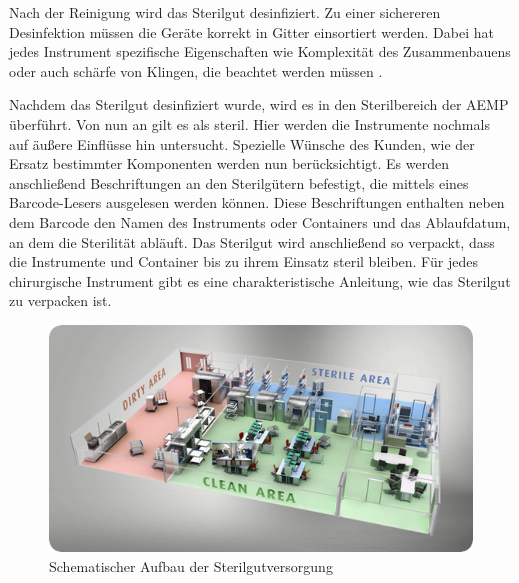 Nach der Reinigung wird das Sterilgut desinfiziert. Zu einer sichereren Desinfektion müssen die Geräte korrekt in Gitter einsortiert werden. Dabei hat jedes Instrument spezifische Eigenschaften wie Komplexität des Zusammenbauens oder auch schärfe von Klingen, die beachtet werden müssen \cite[S.~11]{Ruther2014}.

Nachdem das Sterilgut desinfiziert wurde, wird es in den Sterilbereich der AEMP überführt. Von nun an gilt es als steril. Hier werden die Instrumente nochmals auf äußere Einflüsse hin untersucht. Spezielle Wünsche des Kunden, wie der Ersatz bestimmter Komponenten werden nun berücksichtigt. Es werden anschließend Beschriftungen an den Sterilgütern befestigt, die mittels eines Barcode-Lesers ausgelesen werden können. Diese Beschriftungen enthalten neben dem Barcode den Namen des Instruments oder Containers und das Ablaufdatum, an dem die Sterilität abläuft. Das Sterilgut wird anschließend so verpackt, dass die Instrumente und Container bis zu ihrem Einsatz steril bleiben. Für jedes chirurgische Instrument gibt es eine charakteristische Anleitung, wie das Sterilgut zu verpacken ist.

\begin{figure}[htbp]
    \centering
    \includegraphics[width=1\textwidth]{data/bilder/clean-area-sterile-area.png}
    \caption{Schematischer Aufbau der Sterilgutversorgung \cite{Ives2017}}
    \label{fig:AufbauDerSterilgutversorgung}
\end{figure}

